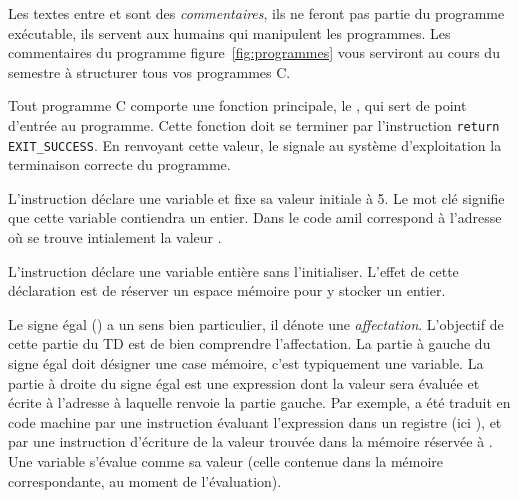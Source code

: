 Les textes entre \C{/*} et \C{*/} sont des \emph{commentaires}, ils ne feront pas partie du programme exécutable, ils servent aux humains qui manipulent les programmes. Les commentaires du programme figure~\ref{fig:programmes} vous serviront au cours du semestre à structurer tous vos programmes C.

Tout programme C comporte une fonction principale, le , qui sert de point d'entrée au programme. Cette fonction doit se terminer par l'instruction \verb+return EXIT_SUCCESS+. En renvoyant cette valeur, le  signale au système d'exploitation la terminaison correcte du programme.



L'instruction  déclare une variable  et fixe sa valeur initiale à 5. Le mot clé  signifie que cette variable contiendra un entier. Dans le code amil  correspond à l'adresse  où se trouve intialement la valeur .

L'instruction  déclare une variable entière  sans l'initialiser. L'effet de cette déclaration est de réserver un espace mémoire pour y stocker un entier.

Le signe égal (\C{=}) a un sens bien particulier, il dénote une
\emph{affectation}. L'objectif de cette partie du TD est de bien comprendre
l'affectation.  La partie à gauche du signe égal doit désigner une case mémoire, c'est typiquement une variable. La partie à droite du signe égal est une expression dont la valeur sera évaluée et écrite à l'adresse à laquelle renvoie la partie gauche. Par exemple,  a été traduit en code machine par une instruction évaluant l'expression  dans un registre (ici ), et par une instruction d'écriture de la valeur trouvée dans la mémoire réservée à . Une variable s'évalue comme sa valeur (celle contenue dans la mémoire correspondante, au moment de l'évaluation).


